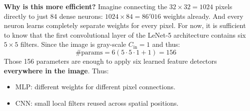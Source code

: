 \highspace
\textcolor{Green3}{ \textbf{Why is this more efficient?}} Imagine connecting the $32 \times 32 = 1024$ pixels directly to just 84 dense neurons: $1024 \times 84 = 86'016$ weights already. And every neuron learns completely separate weights for every pixel. For now, it is sufficient to know that the first convolutional layer of the LeNet-5 architecture contains six $5 \times 5$ filters. Since the image is gray-scale $C_{\text{in}} = 1$ and thus:
\begin{equation*}
    \text{\# params} = 6 \left(5 \cdot 5 \cdot 1 + 1\right) = 156
\end{equation*}
Those 156 parameters are enough to apply six learned feature detectors \textbf{everywhere in the image}. Thus:
\begin{itemize}
    \item MLP: different weights for different pixel connections.
    \item CNN: small local filters reused across spatial positions.
\end{itemize}